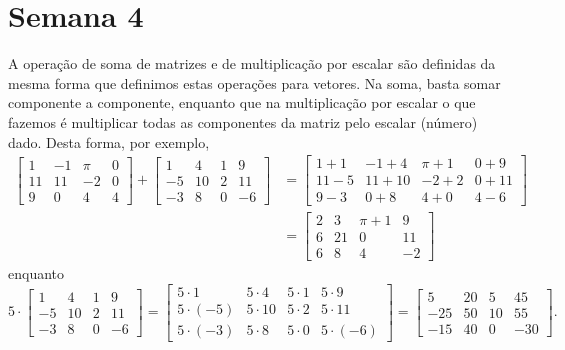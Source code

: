 \documentclass[../livro.tex]{subfiles}  %
\begin{document}
\chapter{Semana 4}


A operação de soma de matrizes e de multiplicação por escalar são definidas da mesma forma que definimos estas operações para vetores. Na soma, basta somar componente a componente, enquanto que na multiplicação por escalar o que fazemos é multiplicar todas as componentes da matriz pelo escalar (número) dado. Desta forma, por exemplo,
\begin{align*}
\left[
\begin{array}{cccc}
1 & -1 & \pi & 0 \\
11 & 11 & -2 & 0 \\
9 & 0 & 4 & 4 
\end{array}
\right] +
\left[
\begin{array}{cccc}
1 & 4 & 1 & 9 \\
-5 & 10 & 2 & 11 \\
-3 & 8 & 0 & -6 
\end{array}
\right] & =
\left[
\begin{array}{cccc}
1+1 & -1 +4 & \pi + 1 & 0+ 9 \\
11-5 & 11+10 & -2+2 & 0+11 \\
9-3 & 0+8 & 4+0 & 4-6 
\end{array}
\right] \\
& =
\left[
\begin{array}{cccc}
2 & 3 & \pi + 1 & 9 \\
6 & 21 & 0 & 11 \\
6 & 8 & 4 & -2 
\end{array}
\right]
\end{align*}
enquanto
\begin{equation}
5\cdot \left[
\begin{array}{cccc}
1 & 4 & 1 & 9 \\
-5 & 10 & 2 & 11 \\
-3 & 8 & 0 & -6 
\end{array}
\right] =
\left[
\begin{array}{cccc}
5\cdot 1 & 5\cdot 4 & 5\cdot 1 & 5\cdot 9 \\
5\cdot (-5) & 5\cdot 10 & 5\cdot 2 & 5\cdot 11 \\
5\cdot (-3) & 5\cdot 8 & 5\cdot 0 & 5\cdot (-6) 
\end{array}
\right] =
\left[
\begin{array}{cccc}
5 & 20 & 5 & 45 \\
-25 & 50 & 10 & 55 \\
-15 & 40 & 0 & -30
\end{array}
\right].
\end{equation}
\end{document}
